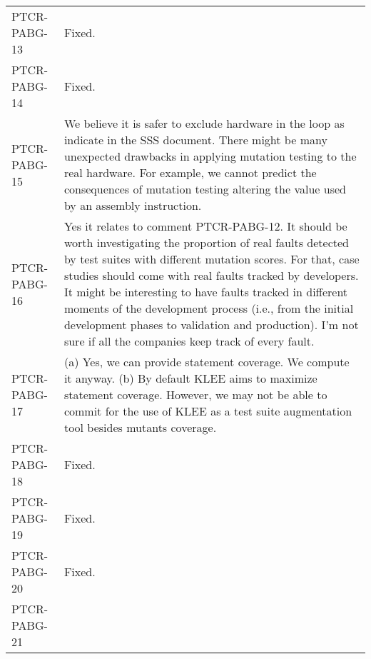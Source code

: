 \begin{longtable}{|p{1.5cm}|p{12cm}|@{}}
\begin{minipage}{12cm}
\end{minipage}\\
\hline
PTCR-PABG-13&
\begin{minipage}{12cm}
Fixed.
\end{minipage}\\
\hline
PTCR-PABG-14&
\begin{minipage}{12cm}
Fixed.
\end{minipage}\\
\hline
PTCR-PABG-15&
\begin{minipage}{12cm}
We believe it is safer to exclude hardware in the loop as indicate in the SSS document. There might be many unexpected drawbacks in applying mutation testing to the real hardware. For example, we cannot predict the consequences of mutation testing altering the value used by an assembly instruction.
\end{minipage}\\
\hline
PTCR-PABG-16&
\begin{minipage}{12cm}
Yes it relates to comment PTCR-PABG-12. It should be worth investigating the proportion of real faults detected by test suites with different mutation scores. For that, case studies should come with real faults tracked by developers. It might be interesting to have faults tracked in different moments of the development process (i.e., from the initial development phases to validation and production). I'm not sure if all the companies keep track of every fault.
\end{minipage}\\
\hline
PTCR-PABG-17&
\begin{minipage}{12cm}
(a) Yes, we can provide statement coverage. We compute it anyway.
(b) By default KLEE aims to maximize statement coverage. However, we may not be able to commit for the use of KLEE as a test suite augmentation tool besides mutants coverage.
\end{minipage}\\
\hline
PTCR-PABG-18&
\begin{minipage}{12cm}
Fixed.
\end{minipage}\\
\hline
PTCR-PABG-19&
\begin{minipage}{12cm}
Fixed.
\end{minipage}\\
\hline
PTCR-PABG-20&
\begin{minipage}{12cm}
Fixed.
\end{minipage}\\
\hline
PTCR-PABG-21&

\end{longtable}
